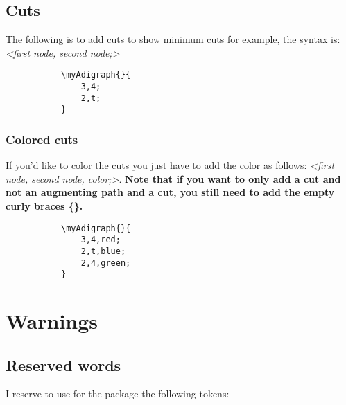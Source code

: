 \documentclass{report}
\begin{document}
\section{Cuts}

The following is to add cuts to show minimum cuts for example, the syntax is: \textit{<first node, second node;>}

\begin{figure}
	\begin{subfigure}{0.49\textwidth}
		\begin{verbatim}
\myAdigraph{}{
	3,4;
	2,t;
}
\end{verbatim}
	\end{subfigure}
	\begin{subfigure}{0.49\textwidth}
	\end{subfigure}
\end{figure}

\subsection{Colored cuts}
If you'd like to color the cuts you just have to add the color as follows: \textit{<first node, second node, color;>}. \textbf{Note that if you want to only add a cut and not an augmenting path and a cut, you still need to add the empty curly braces \{\}.}

\begin{figure}
	\begin{subfigure}{0.49\textwidth}
		\begin{verbatim}
\myAdigraph{}{
	3,4,red;
	2,t,blue;
	2,4,green;
}
\end{verbatim}
	\end{subfigure}
	\begin{subfigure}{0.49\textwidth}
	\end{subfigure}
\end{figure}

\chapter{Warnings}
\section{Reserved words}
I reserve to use for the package the following tokens:
\end{document}
